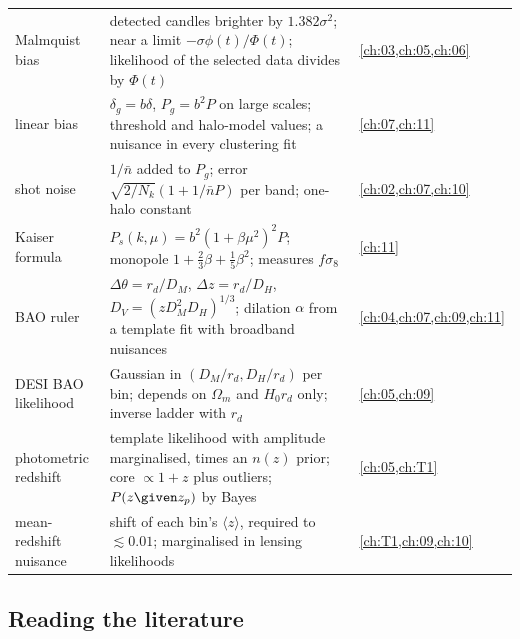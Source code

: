 \begin{center}
\begin{tabularx}{\linewidth}{@{}>{\raggedright\arraybackslash}p{3.2cm}
                               >{\raggedright\arraybackslash}X
                               >{\raggedright\arraybackslash}p{2.4cm}@{}}
Malmquist bias & detected candles brighter by $1.382\sigma^2$; near a limit $-\sigma\phi(t)/\Phi(t)$; likelihood of the selected data divides by $\Phi(t)$ & \cref{ch:03,ch:05,ch:06}\\
linear bias & $\delta_g=b\delta$, $P_g=b^2P$ on large scales; threshold and halo-model values; a nuisance in every clustering fit & \cref{ch:07,ch:11}\\
shot noise & $1/\bar n$ added to $P_g$; error $\sqrt{2/N_k}(1+1/\bar nP)$ per band; one-halo constant & \cref{ch:02,ch:07,ch:10}\\
Kaiser formula & $P_s(k,\mu)=b^2(1+\beta\mu^2)^2P$; monopole $1+\frac23\beta+\frac15\beta^2$; measures $f\sigma_8$ & \cref{ch:11}\\
BAO ruler & $\Delta\theta=r_d/D_M$, $\Delta z=r_d/D_H$, $D_V=(zD_M^2D_H)^{1/3}$; dilation $\alpha$ from a template fit with broadband nuisances & \cref{ch:04,ch:07,ch:09,ch:11}\\
DESI BAO likelihood & Gaussian in $(D_M/r_d,D_H/r_d)$ per bin; depends on $\Omega_m$ and $H_0r_d$ only; inverse ladder with $r_d$ & \cref{ch:05,ch:09}\\
photometric redshift & template likelihood with amplitude marginalised, times an $n(z)$ prior; core $\propto1+z$ plus outliers; $P(z\given z_p)$ by Bayes & \cref{ch:05,ch:T1}\\
mean-redshift nuisance & shift of each bin's $\langle z\rangle$, required to $\lesssim0.01$; marginalised in lensing likelihoods & \cref{ch:T1,ch:09,ch:10}\\
\bottomrule
\end{tabularx}
\end{center}

\subsection*{Reading the literature}

